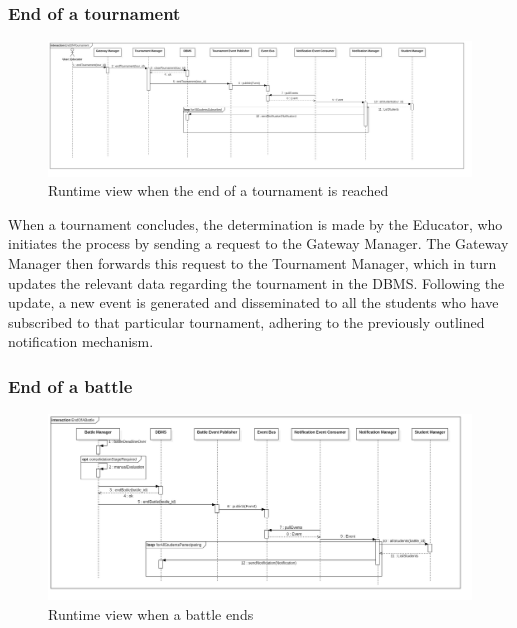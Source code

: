 \subsubsection*{End of a tournament}
\begin{figure}[h!]
    \centering
    \includegraphics[width=1.3\linewidth, angle=90]{2.ArchitecturalDesign/res/EndOfATournament.jpg}
    \caption{Runtime view when the end of a tournament is reached}
    \label{fig:tournament_end}
\end{figure}

When a tournament concludes, the determination is made by the Educator, who initiates the process by sending a request to the Gateway Manager. The Gateway Manager then forwards this request to the Tournament Manager, which in turn updates the relevant data regarding the tournament in the DBMS. Following the update, a new event is generated and disseminated to all the students who have subscribed to that particular tournament, adhering to the previously outlined notification mechanism.

\newpage

\subsubsection*{End of a battle}
\begin{figure}[h!]
    \centering
    \includegraphics[width=1.3\linewidth, angle=90]{2.ArchitecturalDesign/res/EndOfABattle.jpg}
    \caption{Runtime view when a battle ends}
    \label{fig:battle_end}
\end{figure}


